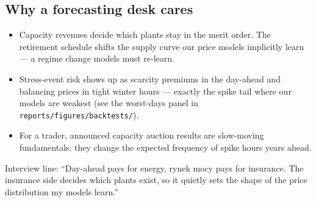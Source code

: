 \subsection{Why a forecasting desk cares}

\begin{itemize}
  \item Capacity revenues decide which plants stay in the merit order.
        The retirement schedule shifts the supply curve our price models
        implicitly learn --- a regime change models must re-learn.
  \item Stress-event risk shows up as scarcity premiums in the
        day-ahead and balancing prices in tight winter hours --- exactly
        the spike tail where our models are weakest (see the worst-days
        panel in \texttt{reports/figures/backtests/}).
  \item For a trader, announced capacity auction results are slow-moving
        fundamentals: they change the expected frequency of spike hours
        years ahead.
\end{itemize}

Interview line: ``Day-ahead pays for energy, rynek mocy pays for
insurance. The insurance side decides which plants exist, so it quietly
sets the shape of the price distribution my models learn.''
